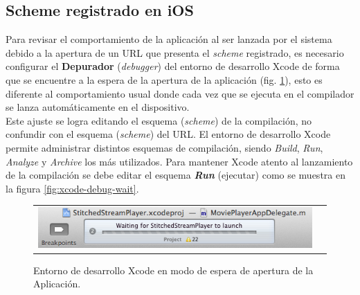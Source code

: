   \subsection{Scheme registrado en iOS}
  
  Para revisar el comportamiento de la aplicación al ser lanzada por el sistema debido a la apertura de un URL que presenta el \textit{scheme} registrado, es necesario configurar el \textbf{Depurador} (\textit{debugger}) del entorno de desarrollo Xcode de forma que se encuentre a la espera de la apertura de la aplicación (fig. \ref{fig:xcode-waitforapp}), esto es diferente al comportamiento usual donde cada vez que se ejecuta en el compilador se lanza automáticamente en el dispositivo.\\
  
Este ajuste se logra editando el esquema (\textit{scheme}) de la compilación, no confundir con el esquema (\textit{scheme}) del URL. El entorno de desarrollo Xcode permite administrar distintos esquemas de compilación, siendo \textit{Build}, \textit{Run}, \textit{Analyze} y \textit{Archive} los más utilizados. Para mantener Xcode atento al lanzamiento de la compilación se debe editar el esquema \textbf{\textit{Run}} (ejecutar) como se muestra en la figura \ref{fig:xcode-debug-wait}.
  

\begin{figure}[H]
	\centering
	\begin{tabular}{cc}
	\includegraphics[scale=0.7]{imgs/xcode-waitforapp.png}
	\end{tabular}
	\caption{Entorno de desarrollo Xcode en modo de espera de apertura de la Aplicación.}
	\label{fig:xcode-waitforapp}
\end{figure}
    
